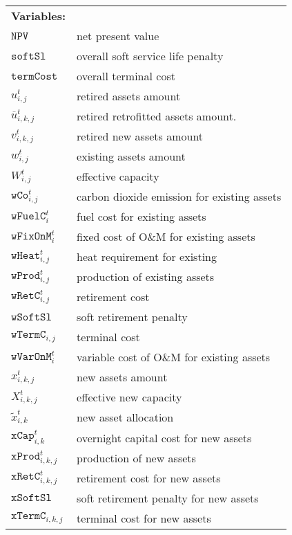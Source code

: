 \documentclass{amsart}
\begin{document}
\begin{centering}
\begin{tabular}{@{}ll@{}}
    \textbf{Variables:} &   \\ 
    $\mathtt{NPV}$          & net present value      \\
    $\mathtt{softSl}$          &   overall soft service life penalty    \\
    $\mathtt{termCost}$          & overall terminal cost      \\
    $u^t_{i,j}$	&	retired assets	amount\\
    $\overline{u}^t_{i,k,j}$	&	retired retrofitted assets amount.	\\
    $v^t_{i,k,j}$	&	retired new assets amount	\\
    $w^t_{i,j}$	&	existing assets	amount \\
    $W^t_{i,j}$	&	effective capacity	\\
    $\mathtt{wCo}^t_{i,j}$	&	carbon dioxide emission for existing assets	\\
    $\mathtt{wFuelC}^t_{i}$	&	fuel cost for existing assets	\\
    $\mathtt{wFixOnM}^t_i$	&	fixed cost of O\&M for existing assets	\\
    $\mathtt{wHeat}^t_{i,j}$	&	heat requirement for existing	\\
    $\mathtt{wProd}^t_{i,j}$	&	production of existing assets	\\
    $\mathtt{wRetC}^t_{i,j}$	&	retirement cost	\\
    $\mathtt{wSoftSl}$	&	soft retirement penalty	\\
    $\mathtt{wTermC}_{i,j}$	&	terminal cost	\\
    $\mathtt{wVarOnM}^t_{i}$	&	variable cost of O\&M for existing assets\\
    $x^t_{i,k,j}$	&	new assets amount	\\
    $X^t_{i,k,j}$	&	effective new capacity	\\
    $\tilde{x}^t_{i,k}$	&	new asset allocation	\\
    $\mathtt{xCap}^t_{i,k}$	&	overnight capital cost for new assets	\\
    $\mathtt{xProd}^t_{i,k,j}$	&	production of new assets	\\
    $\mathtt{xRetC}^t_{i,k,j}$	&	retirement cost for new assets	\\
    $\mathtt{xSoftSl}$	&	soft retirement penalty for new assets	\\
    $\mathtt{xTermC}_{i,k,j}$	&	terminal cost for new assets	\\

\end{tabular}
\end{centering}
\end{document}
